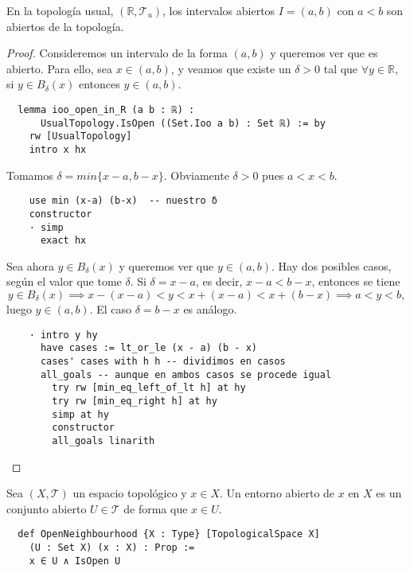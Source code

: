 \begin{example}\label{ejemplo:intervalos-abiertos}
  En la topología usual, $(\mathbb{R}, \mathcal{T}_u)$, los intervalos abiertos $I = (a, b)$ con $a < b$ son abiertos de la topología.
\end{example}

\begin{proof}
  Consideremos un intervalo de la forma $(a, b)$ y queremos ver que es abierto. Para ello, sea $x \in (a, b)$, y veamos que existe un $\delta >0$ tal que $\forall y \in \mathbb{R}$, si $y \in B_\delta(x)$ entonces $y \in (a, b)$.

  \begin{lstlisting}
  lemma ioo_open_in_R (a b : ℝ) :
      UsualTopology.IsOpen ((Set.Ioo a b) : Set ℝ) := by
    rw [UsualTopology]
    intro x hx \end{lstlisting}

  Tomamos $\delta = min \{x-a, b-x\}$. Obviamente $\delta >0$ pues $a < x < b$.

  \begin{lstlisting}
    use min (x-a) (b-x)  -- nuestro δ
    constructor
    · simp
      exact hx \end{lstlisting}

  Sea ahora $y \in B_\delta(x)$ y queremos ver que $y \in (a, b)$. Hay dos posibles casos, según el valor que tome $\delta$. Si $\delta = x-a$, es decir, $x-a < b -x$, entonces se tiene
  $$
  y \in B_\delta(x) \implies x - (x - a) < y < x + (x - a) < x + (b - x) \implies a < y < b,
  $$
  luego $y \in (a, b)$. El caso $\delta = b -x$ es análogo.

  \begin{lstlisting}
    · intro y hy
      have cases := lt_or_le (x - a) (b - x)
      cases' cases with h h -- dividimos en casos
      all_goals -- aunque en ambos casos se procede igual
        try rw [min_eq_left_of_lt h] at hy
        try rw [min_eq_right h] at hy
        simp at hy
        constructor
        all_goals linarith \end{lstlisting}
\end{proof}

\begin{definition}
  Sea $(X, \mathcal{T})$ un espacio topológico y $x \in X$. Un \textnormal{entorno abierto} de $x$ en $X$ es un conjunto abierto $U \in \mathcal{T}$ de forma que $x \in U$.
\end{definition}

\begin{lstlisting}
  def OpenNeighbourhood {X : Type} [TopologicalSpace X]
    (U : Set X) (x : X) : Prop :=
    x ∈ U ∧ IsOpen U
\end{lstlisting}

